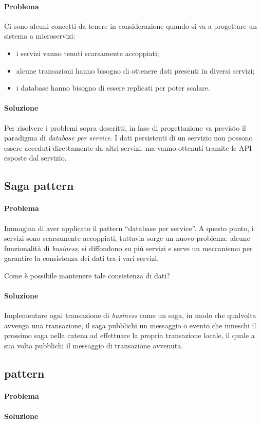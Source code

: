 \paragraph*{Problema} Ci sono alcuni concetti da tenere in considerazione quando si va a progettare un sistema a microservizi:
\begin{itemize}[noitemsep]
	\item i servizi vanno tenuti scarsamente accoppiati;
	\item alcune transazioni hanno bisogno di ottenere dati presenti in diversi servizi;
	\item i database hanno bisogno di essere replicati per poter scalare.
\end{itemize}

\paragraph*{Soluzione} Per risolvere i problemi sopra descritti, in fase di progettazione va previsto il paradigma di \textit{database per service}.
I dati persistenti di un servizio non possono essere acceduti direttamente da altri servizi, ma vanno ottenuti tramite le API esposte dal servizio.


\subsection{Saga pattern}

\paragraph*{Problema} Immagina di aver applicato il pattern ``database per service''.
A questo punto, i servizi sono scarsamente accoppiati, tuttavia sorge un nuovo problema: alcune funzionalità di \textit{business}, si diffondono su più servizi e serve un meccanismo per garantire la consistenza dei dati
tra i vari servizi. 

Come è possibile mantenere tale consistenza di dati?

\paragraph*{Soluzione} Implementare ogni transazione di \textit{business} come un saga, in modo che qualvolta avvenga una transazione, il saga pubblichi un messaggio o evento che inneschi il prossimo saga nella catena ad effettuare la propria transazione locale, il quale a sua volta pubblichi il messaggio di transazione avvenuta.


\subsection{pattern}

\paragraph*{Problema}

\paragraph*{Soluzione}